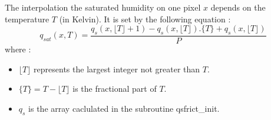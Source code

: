 The interpolation the saturated humidity on one pixel $x$  depends on the temperature $T$ (in Kelvin). 
It is set by the following equation :
\begin{equation}
q_{sat}(x,T)= \dfrac{q_s(x,\lfloor T \rfloor +1) - q_s(x,\lfloor T \rfloor).\lbrace T \rbrace + q_s(x,\lfloor T \rfloor)}{P}
\end{equation}
where : \\
\begin{itemize}
 \item  $ \lfloor T \rfloor $ represents the largest integer not greater than $T$. 
 \item  $ \lbrace T \rbrace = T -\lfloor T \rfloor $ is the fractional part of $T$.
 \item  $q_s$ is the array caclulated in the subroutine qsfrict\_init. 
\end{itemize}

